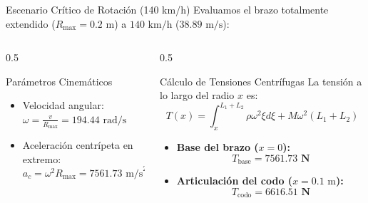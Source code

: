 \documentclass[aspectratio=169,11pt]{beamer}
\begin{document}
\begin{frame}{Escenario Crítico de Rotación (140 km/h)}
    Evaluamos el brazo totalmente extendido ($R_{\text{max}} = 0.2\text{ m}$) a $140\text{ km/h}$ ($38.89\text{ m/s}$):
    \vspace{0.2cm}
    \begin{columns}
        \begin{column}{0.5\textwidth}
            \begin{block}{Parámetros Cinemáticos}
                \begin{itemize}
                    \item Velocidad angular: $\omega = \frac{v}{R_{\text{max}}} = 194.44\text{ rad/s}$
                    \item Aceleración centrípeta en extremo:
                    $$a_c = \omega^2 R_{\text{max}} = 7561.73\text{ m/s}^2 \approx \mathbf{771g}$$
                \end{itemize}
            \end{block}
        \end{column}
        \begin{column}{0.5\textwidth}
            \begin{block}{Cálculo de Tensiones Centrífugas}
                La tensión a lo largo del radio $x$ es:
                $$T(x) = \int_x^{L_1+L_2} \rho \omega^2 \xi d\xi + M \omega^2 (L_1+L_2)$$
                \begin{itemize}
                    \item \textbf{Base del brazo ($x=0$):}
                    $$T_{\text{base}} = \mathbf{7561.73\text{ N}}$$
                    \item \textbf{Articulación del codo ($x=0.1\text{ m}$):}
                    $$T_{\text{codo}} = \mathbf{6616.51\text{ N}}$$
                \end{itemize}
            \end{block}
        \end{column}
    \end{columns}
\end{frame}
\end{document}
